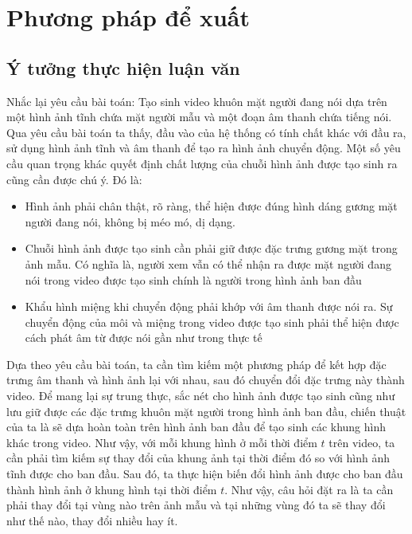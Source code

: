 \chapter{Phương pháp để xuất}

\section{Ý tưởng thực hiện luận văn}

Nhắc lại yêu cầu bài toán: Tạo sinh video khuôn mặt người đang nói dựa trên một hình ảnh tĩnh chứa mặt người mẫu và một đoạn âm thanh chứa tiếng nói. Qua yêu cầu bài toán ta thấy, đầu vào của hệ thống có tính chất khác với đầu ra, sử dụng hình ảnh tĩnh và âm thanh để tạo ra hình ảnh chuyển động. Một số yêu cầu quan trọng khác quyết định chất lượng của chuỗi hình ảnh được tạo sinh ra cũng cần được chú ý. Đó là:
\begin{itemize}
    \item Hình ảnh phải chân thật, rõ ràng, thể hiện được đúng hình dáng gương mặt người đang nói, không bị méo mó, dị dạng.
    \item Chuỗi hình ảnh được tạo sinh cần phải giữ được đặc trưng gương mặt trong ảnh mẫu. Có nghĩa là, người xem vẫn có thể nhận ra được mặt người đang nói trong video được tạo sinh chính là người trong hình ảnh ban đầu
    \item Khẩu hình miệng khi chuyển động phải khớp với âm thanh được nói ra. Sự chuyển động của môi và miệng trong video được tạo sinh phải thể hiện được cách phát âm từ được nói gần như trong thực tế
\end{itemize}

Dựa theo yêu cầu bài toán, ta cần tìm kiếm một phương pháp để kết hợp đặc trưng âm thanh và hình ảnh lại với nhau, sau đó chuyển đổi đặc trưng này thành video. Để mang lại sự trung thực, sắc nét cho hình ảnh được tạo sinh cũng như lưu giữ được các đặc trưng khuôn mặt người trong hình ảnh ban đầu, chiến thuật của ta là sẽ dựa hoàn toàn trên hình ảnh ban đầu để tạo sinh các khung hình khác trong video. Như vậy, với mỗi khung hình ở mỗi thời điểm $t$ trên video, ta cần phải tìm kiếm sự thay đổi của khung ảnh tại thời điểm đó so với hình ảnh tĩnh được cho ban đầu. Sau đó, ta thực hiện biến đổi hình ảnh được cho ban đầu thành hình ảnh ở khung hình tại thời điểm $t$. Như vậy, câu hỏi đặt ra là ta cần phải thay đổi tại vùng nào trên ảnh mẫu và tại những vùng đó ta sẽ thay đổi như thế nào, thay đổi nhiều hay ít.

